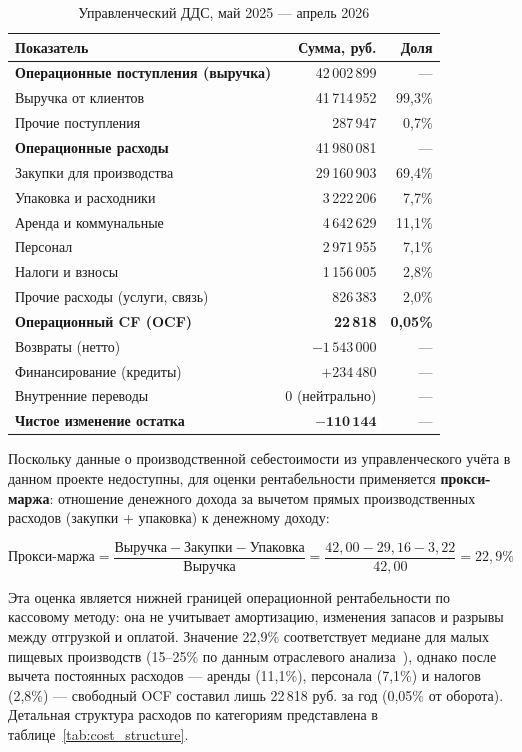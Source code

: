 \begin{table}[H]
\centering
\caption{Управленческий ДДС, май 2025 --- апрель 2026}
\label{tab:dds_summary}
\begin{tabular}{lrr}
\toprule
\textbf{Показатель} & \textbf{Сумма, руб.} & \textbf{Доля} \\
\midrule
\textbf{Операционные поступления (выручка)} & 42\,002\,899 & --- \\
\quad Выручка от клиентов & 41\,714\,952 & 99,3\% \\
\quad Прочие поступления & 287\,947 & 0,7\% \\
\midrule
\textbf{Операционные расходы} & 41\,980\,081 & --- \\
\quad Закупки для производства & 29\,160\,903 & 69,4\% \\
\quad Упаковка и расходники & 3\,222\,206 & 7,7\% \\
\quad Аренда и коммунальные & 4\,642\,629 & 11,1\% \\
\quad Персонал & 2\,971\,955 & 7,1\% \\
\quad Налоги и взносы & 1\,156\,005 & 2,8\% \\
\quad Прочие расходы (услуги, связь) & 826\,383 & 2,0\% \\
\midrule
\textbf{Операционный CF (OCF)} & \textbf{22\,818} & \textbf{0,05\%} \\
\midrule
Возвраты (нетто) & $-1\,543\,000$ & --- \\
Финансирование (кредиты) & $+234\,480$ & --- \\
Внутренние переводы & $0$ (нейтрально) & --- \\
\midrule
\textbf{Чистое изменение остатка} & $\mathbf{-110\,144}$ & --- \\
\bottomrule
\end{tabular}
\end{table}

Поскольку данные о производственной себестоимости из управленческого учёта в данном проекте недоступны, для оценки рентабельности применяется \textbf{прокси-маржа}: отношение денежного дохода за вычетом прямых производственных расходов (закупки + упаковка) к денежному доходу:

\begin{equation}
\text{Прокси-маржа} = \frac{\text{Выручка} - \text{Закупки} - \text{Упаковка}}{\text{Выручка}} = \frac{42{,}00 - 29{,}16 - 3{,}22}{42{,}00} = 22{,}9\%
\end{equation}

Эта оценка является нижней границей операционной рентабельности по кассовому методу: она не учитывает амортизацию, изменения запасов и разрывы между отгрузкой и оплатой. Значение 22,9\% соответствует медиане для малых пищевых производств (15--25\% по данным отраслевого анализа~\cite{sme_profitability_ru}), однако после вычета постоянных расходов --- аренды (11,1\%), персонала (7,1\%) и налогов (2,8\%) --- свободный OCF составил лишь 22\,818 руб. за год (0,05\% от оборота). Детальная структура расходов по категориям представлена в таблице~\ref{tab:cost_structure}.

